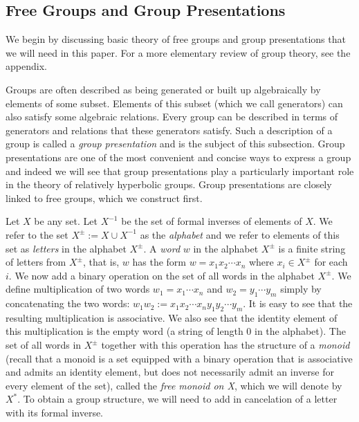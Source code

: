 \documentclass[12pt]{article}
\newcommand{\vs}{\vskip10pt}
\begin{document}
	\subsection{Free Groups and Group Presentations}
	
	\vs 
	
	We begin by discussing basic theory of free groups and group presentations that we will need in this paper. For a more elementary review of group theory, see the appendix. 
	
	\vs
	
	Groups are often described as being generated or built up algebraically by elements of some subset. Elements of this subset (which we call generators) can also satisfy some algebraic relations. Every group can be described in terms of generators and relations that these generators satisfy. Such a description of a group is called a \textit{group presentation} and is the subject of this subsection. Group presentations are one of the most convenient and concise ways to express a group and indeed we will see that group presentations play a particularly important role in the theory of relatively hyperbolic groups. Group presentations are closely linked to free groups, which we construct first. 
	
	\vs 
	
	Let $X$ be any set. Let $X^{-1}$ be the set of formal inverses of elements of $X$. We refer to the set $X^{\pm} := X \cup X^{-1}$ as the \textit{alphabet} and we refer to elements of this set as \textit{letters} in the alphabet $X^{\pm}$. A \textit{word} $w$ in the alphabet $X^{\pm}$ is a finite string of letters from $X^{\pm}$, that is, $w$ has the form $w = x_1 x_2 \cdots x_n$ where $x_i \in X^{\pm}$ for each $i$. We now add a binary operation on the set of all words in the alphabet $X^{\pm}$. We define multiplication of two words $w_1 = x_1 \cdots x_n$ and $w_2 = y_1 \cdots y_m$ simply by concatenating the two words: $w_1 w_2 := x_1 x_2  \cdots x_n y_1 y_2 \cdots y_m$. It is easy to see that the resulting multiplication is associative. We also see that the identity element of this multiplication is the empty word (a string of length 0 in the alphabet). The set of all words in $X^{\pm}$ together with this operation has the structure of a \textit{monoid} (recall that a monoid is a set equipped with a binary operation that is associative and admits an identity element, but does not necessarily admit an inverse for every element of the set), called the \textit{free monoid on X}, which we will denote by $X^*$. To obtain a group structure, we will need to add in cancelation of a letter with its formal inverse. 
	
\end{document}
